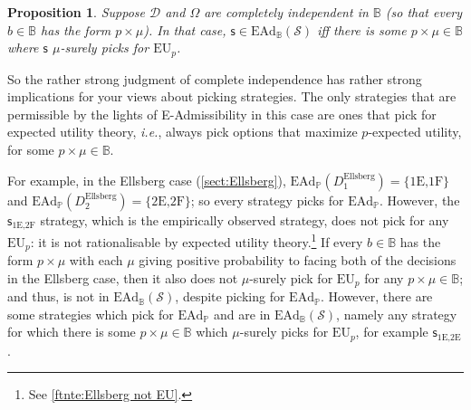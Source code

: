 \documentclass[a4paper]{article}
\newtheorem{proposition}[theorem]{Proposition}
\renewcommand\P{\mathbb{P}} %
\newcommand\EU{\mathrm{EU}}
\newcommand\EAd{\mathrm{EAd}}
\newcommand{\D}{\mathcal{D}}
\renewcommand\S{\mathcal{S}}
\newcommand\s{\mathsf{s}}
\newcommand{\IB}{\mathbb{B}}
\newcommand{\IP}{\P}
\renewcommand{\color}[1]{}
\newcommand{\Strategies}{\S}
\newenvironment{CCM rewritten}
{\begingroup\color{blue}} %
{\endgroup}              %
\begin{document}
\begin{proposition}\label{thm:ead-equiv[indep]} Suppose $\D$ and $\Omega$ are completely independent in $\IB$ (so that every $b\in\IB$ has the form $p\times\mu$). In that case, $\s\in\EAd_\IB(\Strategies)$ iff there is some $p\times \mu\in\IB$ where $\s$ $\mu$-surely picks for $\EU_p$. 
\end{proposition}

So the rather strong judgment of complete independence has rather strong implications for your views about picking strategies. The only strategies that are permissible by the lights of E-Admissibility in this case are ones that pick for expected utility theory, \emph{i.e.}, always pick options that maximize $p$-expected utility, for some $p\times \mu\in\IB$.



\begin{comment}
{\color{violet}
In fact, these are pretty much the only strategies that are permissible by the lights of E-Admissibility when coupled with $\IB$. Immediate from the definition of E-Admissibility, we have that a strategy is in $\EAd_\IB(\S)$ just if it is in $\EU_B(\S)$ for some $B\in\IB$. We can thus make use of \cref{thm:eu-self-rec,thm:eu-uniquely-optimal} to get the following, which applies when we have a strong independence. (In \cref{sect:EAd-dep} we will describe how this assumption can be dropped, but we first analyse it under this assumption.) 

\begin{proposition}\label{thm:ead-equiv[indep]}Suppose every $b\in\IB$ has the form $p\times\mu$.
	
	Then, $\s\in\EAd_\IB(\Strategies)$ iff $\s$ $\mu$-surely picks for $\EU_p$ for some $p\times \mu\in\IB$. 
\end{proposition}}
\end{comment}



For example, in the Ellsberg case (\cref{sect:Ellsberg}), $\EAd_\IP(D^{\mathrm{Ellsberg}}_1)=\{\text{1E,1F}\}$ and $\EAd_\IP(D^{\mathrm{Ellsberg}}_2)=\{\text{2E,2F}\}$; so every strategy picks for $\EAd_\IP$. 
However, the $\s_{\text{1E,2F}}$ strategy, which is the empirically observed strategy, does not pick for any $\EU_p$: it is not rationalisable by expected utility theory.\footnote{See \cref{ftnte:Ellsberg not EU}.} 
If every $b\in\IB$ has the form $p\times\mu$ with each $\mu$ giving positive probability to facing both of the decisions in the Ellsberg case, then it also does not $\mu$-surely pick for $\EU_p$ for any $p\times\mu\in\IB$; and thus, is not in $\EAd_\IB(\S)$, despite picking for $\EAd_\IP$. 
However, there are some strategies which pick for $\EAd_\IP$ and are in $\EAd_\IB(\S)$, namely any strategy for which there is some $p\times\mu\in\IB$ which $\mu$-surely picks for $\EU_p$, for example $\s_{\text{1E,2E}}$. 
\end{document}
